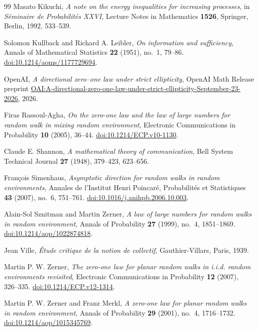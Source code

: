 \begin{thebibliography}{99}
Masato Kikuchi,
\emph{A note on the energy inequalities for increasing processes},
in \emph{S\'eminaire de Probabilit\'es XXVI},
Lecture Notes in Mathematics \textbf{1526}, Springer, Berlin, 1992, 533--539.

Solomon Kullback and Richard A. Leibler,
\emph{On information and sufficiency},
Annals of Mathematical Statistics \textbf{22} (1951), no.~1, 79--86.
\href{https://doi.org/10.1214/aoms/1177729694}{doi:10.1214/aoms/1177729694}.

OpenAI,
\emph{A directional zero--one law under strict ellipticity},
OpenAI Math Release preprint
\href{https://github.com/openai/math/blob/main/preprints/A-directional-zero-one-law-under-strict-ellipticity-September-23-2026/paper.pdf}{OAI:A-directional-zero-one-law-under-strict-ellipticity-September-23-2026},
2026.

Firas Rassoul-Agha,
\emph{On the zero-one law and the law of large numbers for random walk in mixing random environment},
Electronic Communications in Probability \textbf{10} (2005), 36--44.
\href{https://doi.org/10.1214/ECP.v10-1130}{doi:10.1214/ECP.v10-1130}.

Claude E. Shannon,
\emph{A mathematical theory of communication},
Bell System Technical Journal \textbf{27} (1948), 379--423, 623--656.

Fran\c{c}ois Simenhaus,
\emph{Asymptotic direction for random walks in random environments},
Annales de l'Institut Henri Poincar\'e, Probabilit\'es et Statistiques
\textbf{43} (2007), no.~6, 751--761.
\href{https://doi.org/10.1016/j.anihpb.2006.10.003}{doi:10.1016/j.anihpb.2006.10.003}.

Alain-Sol Sznitman and Martin Zerner,
\emph{A law of large numbers for random walks in random environment},
Annals of Probability \textbf{27} (1999), no.~4, 1851--1869.
\href{https://doi.org/10.1214/aop/1022874818}{doi:10.1214/aop/1022874818}.

Jean Ville,
\emph{\'Etude critique de la notion de collectif},
Gauthier-Villars, Paris, 1939.

Martin P. W. Zerner,
\emph{The zero-one law for planar random walks in i.i.d. random environments revisited},
Electronic Communications in Probability \textbf{12} (2007), 326--335.
\href{https://doi.org/10.1214/ECP.v12-1314}{doi:10.1214/ECP.v12-1314}.

Martin P. W. Zerner and Franz Merkl,
\emph{A zero-one law for planar random walks in random environment},
Annals of Probability \textbf{29} (2001), no.~4, 1716--1732.
\href{https://doi.org/10.1214/aop/1015345769}{doi:10.1214/aop/1015345769}.

\end{thebibliography}
